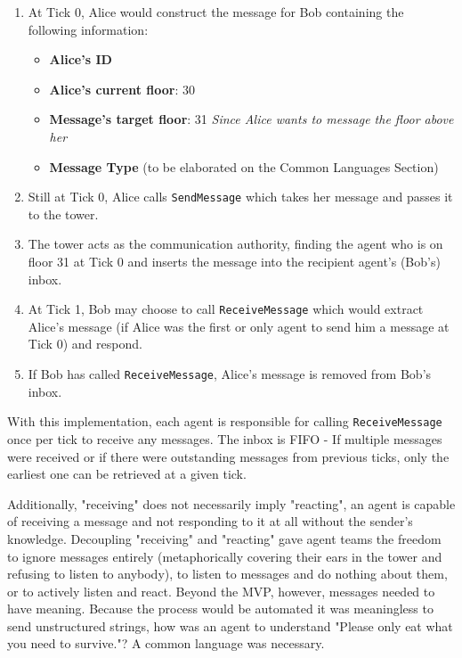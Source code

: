 \documentclass{article}
\begin{document}
\begin{enumerate}
    \item At Tick 0, Alice would construct the message for Bob containing the following information:
        \begin{itemize}
            \item \textbf{Alice's ID}
            \item \textbf{Alice's current floor}: 30
            \item \textbf{Message's target floor}: 31 \textit{Since Alice wants to message the floor above her}
            \item \textbf{Message Type} (to be elaborated on the Common Languages Section)
        \end{itemize}
    \item Still at Tick 0, Alice calls \texttt{SendMessage} which takes her message and passes it to the tower.
    \item The tower acts as the communication authority, finding the agent who is on floor 31 at Tick 0 and inserts the message into the recipient agent's (Bob's) inbox.
    \item At Tick 1, Bob may choose to call \texttt{ReceiveMessage} which would extract Alice's message (if Alice was the first or only agent to send him a message at Tick 0) and respond.
    \item If Bob has called \texttt{ReceiveMessage}, Alice's message is removed from Bob's inbox.
\end{enumerate}
With this implementation, each agent is responsible for calling \texttt{ReceiveMessage} once per tick to receive any messages. The inbox is FIFO - If multiple messages were received or if there were outstanding messages from previous ticks, only the earliest one can be retrieved at a given tick.

Additionally, "receiving" does not necessarily imply "reacting", an agent is capable of receiving a message and not responding to it at all without the sender's knowledge. Decoupling "receiving" and "reacting" gave agent teams the freedom to ignore messages entirely (metaphorically covering their ears in the tower and refusing to listen to anybody), to listen to messages and do nothing about them, or to actively listen and react. \newline
Beyond the MVP, however, messages needed to have meaning. Because the process would be automated it was meaningless to send unstructured strings, how was an agent to understand "Please only eat what you need to survive."? \newline
A common language was necessary.
\end{document}
